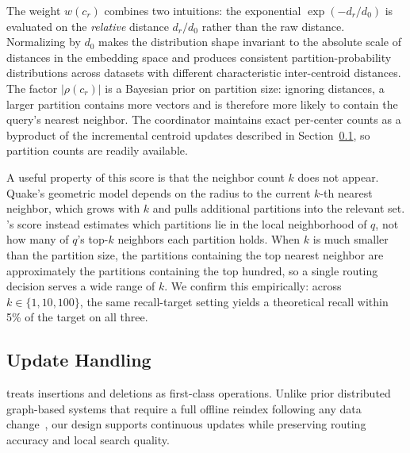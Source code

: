 \documentclass[sigconf,review,anonymous]{acmart}
\begin{document}

    The weight $w(c_r)$ combines two intuitions: the exponential $\exp(- d_r / d_0)$ is evaluated on the \emph{relative} distance $d_r / d_0$ rather than the raw distance. Normalizing by $d_0$ makes the distribution shape invariant to the absolute scale of distances in the embedding space and produces consistent partition-probability distributions across datasets with different characteristic inter-centroid distances. The factor $\lvert\rho(c_r)\rvert$ is a Bayesian prior on partition size: ignoring distances, a larger partition contains more vectors and is therefore more likely to contain the query's nearest neighbor. The coordinator maintains exact per-center counts as a byproduct of the incremental centroid updates described in Section~\ref{sec:update-handling}, so partition counts are readily available.

    A useful property of this score is that the neighbor count $k$ does not appear. Quake's geometric model depends on the radius to the current $k$-th nearest neighbor, which grows with $k$ and pulls additional partitions into the relevant set. \SystemName{}'s score instead estimates which partitions lie in the local neighborhood of $q$, not how many of $q$'s top-$k$ neighbors each partition holds. When $k$ is much smaller than the partition size, the partitions containing the top nearest neighbor are approximately the partitions containing the top hundred, so a single routing decision serves a wide range of $k$. We confirm this empirically: across $k \in \{1, 10, 100\}$, the same recall-target setting yields a theoretical recall within 5\% of the target on all three.
    
\subsection{Update Handling}
\label{sec:update-handling}
    \SystemName{} treats insertions and deletions as first-class operations. Unlike prior distributed graph-based systems that require a full offline reindex following any data change~\cite{deng2019pyramid, gottensuren2025unleashing}, our design supports continuous updates while preserving routing accuracy and local search quality.
\end{document}
